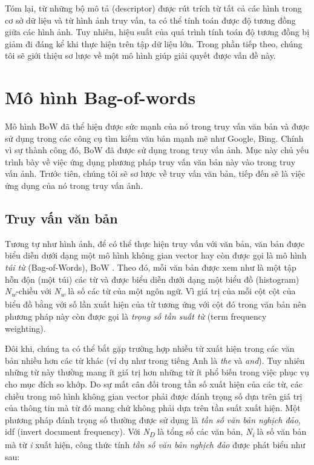 Tóm lại, từ những bộ mô tả (descriptor) được rút trích từ tất cả các hình trong cơ sở dữ liệu và từ hình ảnh truy vấn, ta có thể tính toán được độ tương đồng giữa các hình ảnh. Tuy nhiên, hiệu suất của quá trình tính toán độ tương đồng bị giảm đi đáng kể khi thực hiện trên tập dữ liệu lớn. Trong phần tiếp theo, chúng tôi sẽ giới thiệu sơ lược về một mô hình giúp giải quyết được vấn đề này.

\section{Mô hình Bag-of-words}
\label{bag-of-words}
Mô hình BoW đã thể hiện được sức mạnh của nó trong truy vấn văn bản và được sử dụng trong các công cụ tìm kiếm văn bản mạnh mẽ như Google, Bing. Chính vì sự thành công đó, BoW đã được sử dụng trong truy vấn ảnh. Mục này chủ yếu trình bày về việc ứng dụng phương pháp truy vấn văn bản này vào trong truy vấn ảnh. Trước tiên, chúng tôi sẽ sơ lược về truy vấn văn bản, tiếp đến sẽ là việc ứng dụng của nó trong truy vấn ảnh.

\subsection{Truy vấn văn bản}
Tương tự như hình ảnh, để có thể thực hiện truy vấn với văn bản, văn bản được biểu diễn dưới dạng một mô hình không gian vector \cite{Salton:1986:IMI:576628} hay còn được gọi là mô hình \textit{túi từ} (Bag-of-Words), BoW \cite{manning2008introduction}. Theo đó, mỗi văn bản được xem như là một tập hỗn độn (một túi) các từ và được biểu diễn dưới dạng một biểu đồ (histogram) \textit{N\textsubscript{w}}-chiều với \textit{N\textsubscript{w}} là số các từ của một ngôn ngữ. Vì giá trị của mỗi cột cột của biểu đồ bằng với số lần xuất hiện của từ tương ứng với cột đó trong văn bản nên phương pháp này còn được gọi là \textit{trọng số tần suất từ} (term frequency weighting).

Đôi khi, chúng ta có thể bắt gặp trường hợp nhiều từ xuất hiện trong các văn bản nhiều hơn các từ khác (ví dụ như trong tiếng Anh là \textit{the} và \textit{and}). Tuy nhiên những từ này thường mang ít giá trị hơn những từ ít phổ biến trong việc phục vụ cho mục đích so khớp. Do sự mất cân đối trong tần số xuất hiện của các từ, các chiều trong mô hình không gian vector phải được đánh trọng số dựa trên giá trị của thông tin mà từ đó mang chứ không phải dựa trên tần suất xuất hiện. Một phương pháp đánh trọng số thường được sử dụng là \textit{tần số văn bản nghịch đảo}, idf (invert document frequency). Với \textit{N\textsubscript{D}} là tổng số các văn bản, \textit{N\textsubscript{i}} là số văn bản mà từ \textit{i} xuất hiện, công thức tính \textit{tần số văn bản nghịch đảo} được phát biểu như sau:

